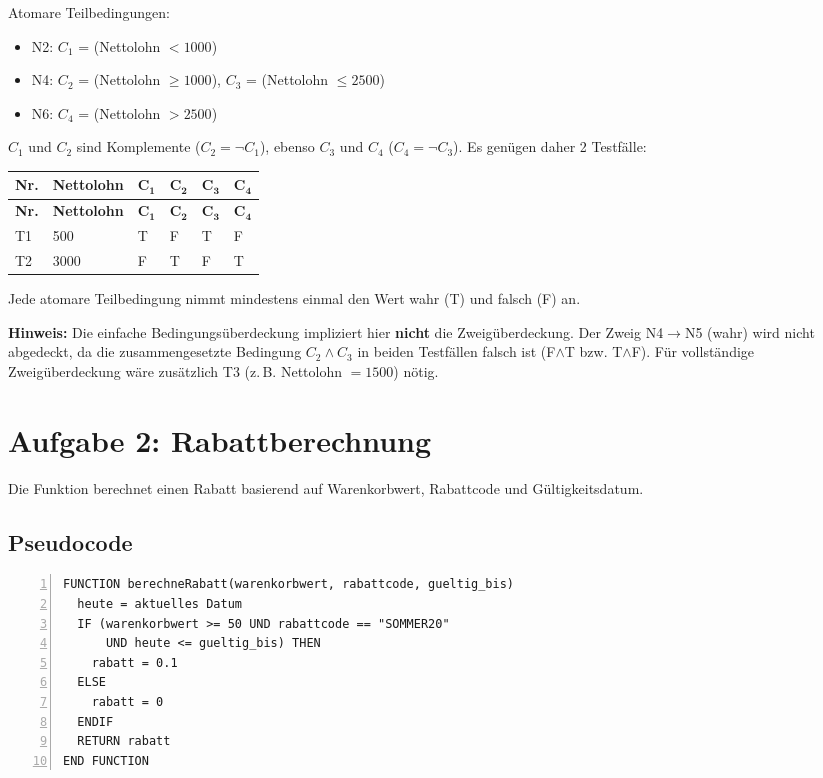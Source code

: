 \documentclass[
	fontsize=12pt,          %
	paper=a4,               %
	numbers=noenddot,       %
	listof=totoc,           %
	listof=entryprefix,     %
	listof=nochaptergap,    %
	bibliography=totoc,     %
	parskip=half,           %
	openany                 %
]{scrbook}
\begin{document}
Atomare Teilbedingungen:
\begin{itemize}
	\item N2: $C_1$ = (Nettolohn $< 1000$)
	\item N4: $C_2$ = (Nettolohn $\geq 1000$), \quad $C_3$ = (Nettolohn $\leq 2500$)
	\item N6: $C_4$ = (Nettolohn $> 2500$)
\end{itemize}

$C_1$ und $C_2$ sind Komplemente ($C_2 = \neg C_1$), ebenso $C_3$ und $C_4$ ($C_4 = \neg C_3$).
Es genügen daher 2 Testfälle:

\begin{longtable}{| p{0.5cm} | p{2.0cm} | p{1.5cm} | p{1.5cm} | p{1.5cm} | p{1.5cm} |}
	\hline
	\textbf{Nr.} & \textbf{Nettolohn} & $\mathbf{C_1}$ & $\mathbf{C_2}$ & $\mathbf{C_3}$ & $\mathbf{C_4}$ \\ \hline
	\endfirsthead
	\hline
	\textbf{Nr.} & \textbf{Nettolohn} & $\mathbf{C_1}$ & $\mathbf{C_2}$ & $\mathbf{C_3}$ & $\mathbf{C_4}$ \\ \hline
	\endhead
	\hline
	\endfoot
	T1 & 500 & T & F & T & F \\ \hline
	T2 & 3000 & F & T & F & T \\ \hline
\end{longtable}

Jede atomare Teilbedingung nimmt mindestens einmal den Wert wahr (T) und falsch (F) an.

\textbf{Hinweis:} Die einfache Bedingungsüberdeckung impliziert hier \textbf{nicht} die Zweigüberdeckung.
Der Zweig N4$\to$N5 (wahr) wird nicht abgedeckt, da die zusammengesetzte Bedingung $C_2 \wedge C_3$ in beiden Testfällen falsch ist (F$\wedge$T bzw. T$\wedge$F).
Für vollständige Zweigüberdeckung wäre zusätzlich T3 (z.\,B. Nettolohn $= 1500$) nötig.


\chapter*{Aufgabe 2: Rabattberechnung}

Die Funktion berechnet einen Rabatt basierend auf Warenkorbwert, Rabattcode und Gültigkeitsdatum.

\section*{Pseudocode}

\begin{lstlisting}[language={},numbers=left,xleftmargin=2em]
FUNCTION berechneRabatt(warenkorbwert, rabattcode, gueltig_bis)
  heute = aktuelles Datum
  IF (warenkorbwert >= 50 UND rabattcode == "SOMMER20"
      UND heute <= gueltig_bis) THEN
    rabatt = 0.1
  ELSE
    rabatt = 0
  ENDIF
  RETURN rabatt
END FUNCTION
\end{lstlisting}
\end{document}
